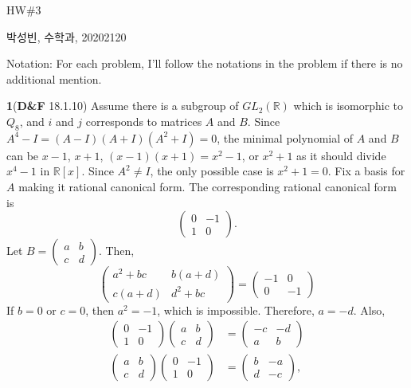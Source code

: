 \documentclass[a4paper, 12pt]{article}
\theoremstyle{Mydefinition}
\theoremstyle{Mytheorem}
\begin{document}
\thispagestyle{myfirstpage}
\begin{center}
	\Large{HW\#3}
\end{center}
박성빈, 수학과, 20202120

Notation: For each problem, I'll follow the notations in the problem if there is no additional mention.

\noindent \textbf{1}(\textbf{D\&F} 18.1.10)
Assume there is a subgroup of $GL_2(\mathbb{R})$ which is isomorphic to $Q_8$, and $i$ and $j$ corresponds to matrices $A$ and $B$. Since $A^4-I =(A-I)(A+I)(A^2+I)= 0$, the minimal polynomial of $A$ and $B$ can be $x-1$, $x+1$, $(x-1)(x+1)=x^2-1$, or $x^2+1$ as it should divide $x^4-1$ in $\mathbb{R}[x]$. Since $A^2\neq I$, the only possible case is $x^2+1=0$. Fix a basis for $A$ making it rational canonical form. The corresponding rational canonical form is
\begin{equation}
    \begin{pmatrix}
        0 & -1\\
        1 & 0
    \end{pmatrix}.
\end{equation}
Let $B=\begin{pmatrix}
    a & b\\ c & d
\end{pmatrix}$. Then,
\begin{equation}
    \begin{pmatrix}
        a^2+bc & b(a+d)\\
        c(a+d) & d^2+bc
    \end{pmatrix} = \begin{pmatrix}
        -1 & 0\\
        0 & -1
    \end{pmatrix}
\end{equation}
If $b=0$ or $c=0$, then $a^2 = -1$, which is impossible. Therefore, $a=-d$. Also,
\begin{equation}
\begin{split}
    \begin{pmatrix}
        0 & -1\\
        1 & 0
    \end{pmatrix}\begin{pmatrix}
    a & b\\ c & d
\end{pmatrix} &= \begin{pmatrix}
    -c & -d \\
    a & b
\end{pmatrix}\\
\begin{pmatrix}
    a & b\\ c & d
\end{pmatrix}\begin{pmatrix}
        0 & -1\\
        1 & 0
    \end{pmatrix} &= \begin{pmatrix}
    b & -a \\
    d & -c
\end{pmatrix},
\end{split}
\end{equation}
\end{document}
